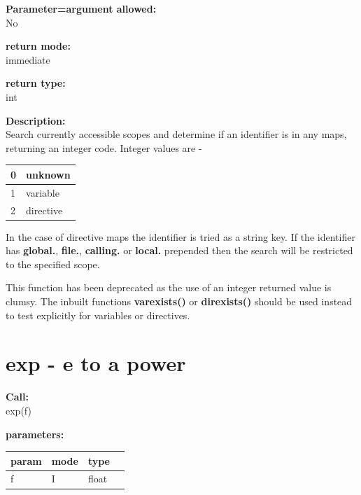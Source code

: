         {\bf Parameter=argument allowed:} \\
        No
        
        {\bf return mode:} \\
        immediate

        {\bf return type:} \\
        int
        
        {\bf Description:} \\
        Search currently accessible scopes and determine if an identifier is
        in any maps, returning an integer code. Integer values are -

        \begin{tabular}{| l | l |}
        \hline
        0 & unknown     \\ \hline
        1 & variable    \\ \hline
        2 & directive   \\ \hline
        \end{tabular}

        In the case of directive maps the identifier is tried as a string key. If
        the identifier has {\bf global.}, {\bf file.}, {\bf calling.} or {\bf
        local.} prepended then the search will be restricted to the specified
        scope.
        
        This function has been deprecated as the use of an integer returned
        value is clumsy. The inbuilt functions {\bf varexists()}
         or {\bf direxists()}
         should be used instead to test explicitly
        for variables or directives.



    \section{exp - e to a power}\label{sec:ifexp}
        
        {\bf Call:} \\
        exp(f)
        
        {\bf parameters:} \\
        \begin{tabular}{| l | l | l | l |}
        \hline
        param  & mode & type & \\
        \hline \hline
        f & I & float & \\ \hline
        \end{tabular}
        
